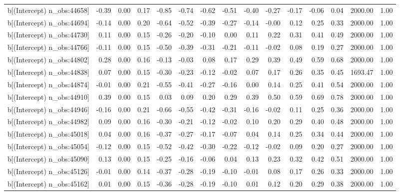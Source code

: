 \begin{table}[ht]
\begin{tabular}{rrrrrrrrrrrrrrr}
  b[(Intercept) n\_obs:44658] & -0.39 & 0.00 & 0.17 & -0.85 & -0.74 & -0.62 & -0.51 & -0.40 & -0.27 & -0.17 & -0.06 & 0.04 & 2000.00 & 1.00 \\ 
  b[(Intercept) n\_obs:44694] & -0.14 & 0.00 & 0.20 & -0.64 & -0.52 & -0.39 & -0.27 & -0.14 & -0.00 & 0.12 & 0.25 & 0.33 & 2000.00 & 1.00 \\ 
  b[(Intercept) n\_obs:44730] & 0.11 & 0.00 & 0.15 & -0.26 & -0.20 & -0.10 & 0.00 & 0.11 & 0.22 & 0.31 & 0.41 & 0.49 & 2000.00 & 1.00 \\ 
  b[(Intercept) n\_obs:44766] & -0.11 & 0.00 & 0.15 & -0.50 & -0.39 & -0.31 & -0.21 & -0.11 & -0.02 & 0.08 & 0.19 & 0.27 & 2000.00 & 1.00 \\ 
  b[(Intercept) n\_obs:44802] & 0.28 & 0.00 & 0.16 & -0.13 & -0.03 & 0.08 & 0.17 & 0.29 & 0.39 & 0.49 & 0.59 & 0.68 & 2000.00 & 1.00 \\ 
  b[(Intercept) n\_obs:44838] & 0.07 & 0.00 & 0.15 & -0.30 & -0.23 & -0.12 & -0.02 & 0.07 & 0.17 & 0.26 & 0.35 & 0.45 & 1693.47 & 1.00 \\ 
  b[(Intercept) n\_obs:44874] & -0.01 & 0.00 & 0.21 & -0.55 & -0.41 & -0.27 & -0.16 & 0.00 & 0.14 & 0.25 & 0.41 & 0.54 & 2000.00 & 1.00 \\ 
  b[(Intercept) n\_obs:44910] & 0.39 & 0.00 & 0.15 & 0.03 & 0.09 & 0.20 & 0.29 & 0.39 & 0.50 & 0.59 & 0.69 & 0.78 & 2000.00 & 1.00 \\ 
  b[(Intercept) n\_obs:44946] & -0.16 & 0.00 & 0.21 & -0.66 & -0.55 & -0.42 & -0.31 & -0.16 & -0.02 & 0.11 & 0.25 & 0.36 & 2000.00 & 1.00 \\ 
  b[(Intercept) n\_obs:44982] & 0.09 & 0.00 & 0.16 & -0.30 & -0.21 & -0.12 & -0.02 & 0.10 & 0.20 & 0.29 & 0.40 & 0.48 & 2000.00 & 1.00 \\ 
  b[(Intercept) n\_obs:45018] & 0.04 & 0.00 & 0.16 & -0.37 & -0.27 & -0.17 & -0.07 & 0.04 & 0.14 & 0.25 & 0.34 & 0.44 & 2000.00 & 1.00 \\ 
  b[(Intercept) n\_obs:45054] & -0.12 & 0.00 & 0.15 & -0.52 & -0.42 & -0.30 & -0.22 & -0.12 & -0.02 & 0.09 & 0.20 & 0.27 & 2000.00 & 1.00 \\ 
  b[(Intercept) n\_obs:45090] & 0.13 & 0.00 & 0.15 & -0.25 & -0.16 & -0.06 & 0.04 & 0.13 & 0.23 & 0.32 & 0.42 & 0.51 & 2000.00 & 1.00 \\ 
  b[(Intercept) n\_obs:45126] & -0.01 & 0.00 & 0.14 & -0.37 & -0.28 & -0.19 & -0.10 & -0.01 & 0.08 & 0.17 & 0.26 & 0.33 & 2000.00 & 1.00 \\ 
  b[(Intercept) n\_obs:45162] & 0.01 & 0.00 & 0.15 & -0.36 & -0.28 & -0.19 & -0.10 & 0.01 & 0.12 & 0.20 & 0.29 & 0.38 & 2000.00 & 1.00 \\ 

\end{tabular}
\end{table}
